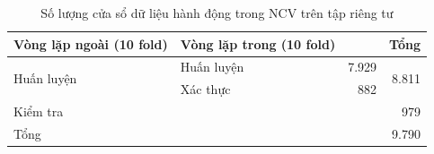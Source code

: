 \begin{table}[b!]
    \centering
    \caption{Số lượng cửa sổ dữ liệu hành động trong NCV trên tập riêng tư}
    \label{nested_cv_har}
    \begin{tabular}{llrr}\hline\hline
        \textbf{Vòng lặp ngoài (10 fold)} & \textbf{Vòng lặp trong (10 fold)} &  & \textbf{Tổng}\\\hline
        \multirow{2}{*}{Huấn luyện} & Huấn luyện & 7.929 & \multirow{2}{*}{8.811}\\\cline{2-3}
         & Xác thực & 882 & \\\hline
        Kiểm tra &  &  & 979\\\hline
        Tổng &  &  & 9.790\\\hline\hline
    \end{tabular}
\end{table}

